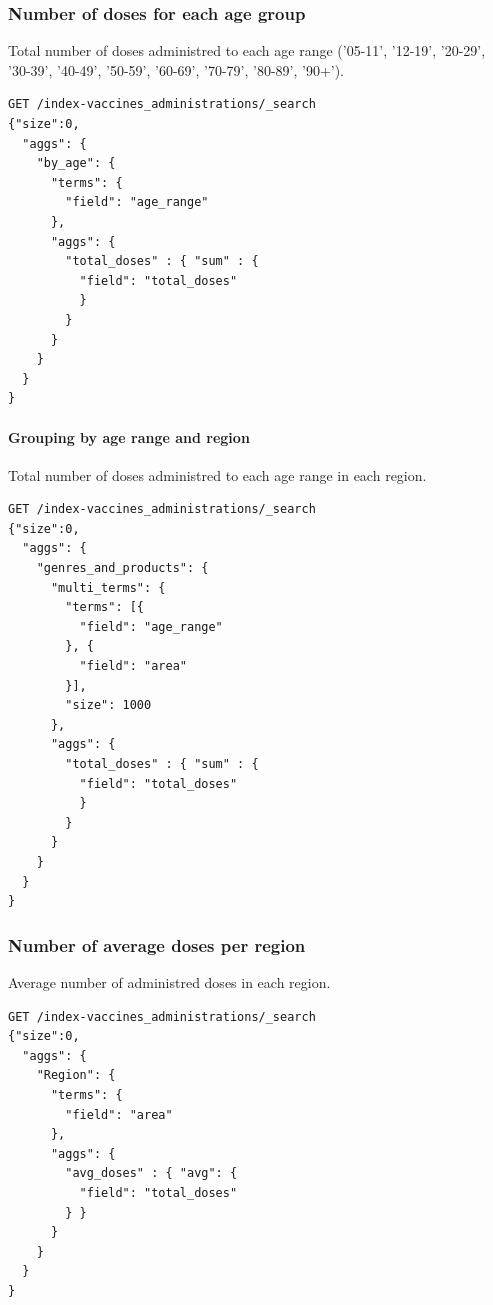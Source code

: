 \documentclass[12pt, a4paper]{article}
\begin{document}
\subsubsection{Number of doses for each age group}
Total number of doses administred to each age range ('05-11', '12-19', '20-29', '30-39',
'40-49', '50-59', '60-69', '70-79', '80-89', '90+').
\begin{tcolorbox}[fontupper=\scriptsize]
  \begin{verbatim}
GET /index-vaccines_administrations/_search
{"size":0,
  "aggs": {
    "by_age": {
      "terms": {
        "field": "age_range"
      },
      "aggs": {
        "total_doses" : { "sum" : { 
          "field": "total_doses"
          }
        }
      }
    }
  }
}
  \end{verbatim}
\end{tcolorbox}

\paragraph{Grouping by age range and region} \mbox{}

\vspace*{1em}

Total number of doses administred to each age range in each region.
\begin{tcolorbox}[fontupper=\scriptsize]
  \begin{verbatim}
GET /index-vaccines_administrations/_search
{"size":0,
  "aggs": {
    "genres_and_products": {
      "multi_terms": {
        "terms": [{
          "field": "age_range" 
        }, {
          "field": "area"
        }], 
        "size": 1000
      },
      "aggs": {
        "total_doses" : { "sum" : { 
          "field": "total_doses"
          } 
        }
      }
    }
  }
}
  \end{verbatim}
\end{tcolorbox}

\subsubsection{Number of average doses per region}
Average number of administred doses in each region.
\begin{tcolorbox}[fontupper=\scriptsize]
  \begin{verbatim}
GET /index-vaccines_administrations/_search
{"size":0,
  "aggs": {
    "Region": {
      "terms": {
        "field": "area"
      },
      "aggs": {
        "avg_doses" : { "avg": {
          "field": "total_doses"
        } } 
      }
    }
  }
}
  \end{verbatim}
\end{tcolorbox}
\end{document}
